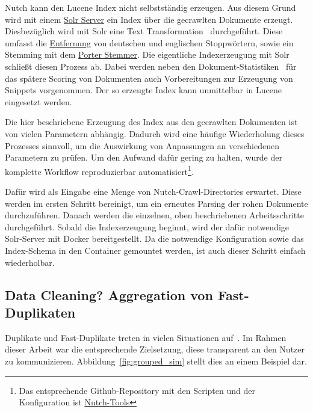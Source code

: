 Nutch kann den Lucene Index nicht selbstständig erzeugen.
Aus diesem Grund wird mit einem \href{http://lucene.apache.org/solr/}{Solr Server} ein Index über die gecrawlten Dokumente erzeugt.
Diesbezüglich wird mit Solr eine Text Transformation~\cite{croft.chap2} durchgeführt.
Diese umfasst die \href{https://github.com/apache/lucene-solr/blob/master/lucene/analysis/common/src/java/org/apache/lucene/analysis/core/StopFilterFactory.java}
{Entfernung} von deutschen und englischen Stoppwörtern, sowie ein Stemming mit dem
\href{https://github.com/apache/lucene-solr/blob/master/lucene/analysis/common/src/java/org/apache/lucene/analysis/en/PorterStemFilterFactory.java}{Porter Stemmer}.
Die eigentliche Indexerzeugung mit Solr schließt diesen Prozess ab.
Dabei werden neben den Dokument-Statistiken~\cite{croft.chap2} für das spätere Scoring von Dokumenten auch Vorbereitungen zur Erzeugung von Snippets vorgenommen.
Der so erzeugte Index kann unmittelbar in Lucene eingesetzt werden.

Die hier beschriebene Erzeugung des Index aus den gecrawlten Dokumenten ist von vielen Parametern abhängig.
Dadurch wird eine häufige Wiederholung dieses Prozesses sinnvoll, um die Auswirkung von Anpassungen an verschiedenen Parametern zu prüfen.
Um den Aufwand dafür gering zu halten, wurde der komplette Workflow reproduzierbar automatisiert\footnote{Das entsprechende Github-Repository mit
den Scripten und der Konfiguration ist \href{https://github.com/mam10eks/nutch_tools/}{Nutch-Tools}}.

Dafür wird als Eingabe eine Menge von Nutch-Crawl-Directories erwartet.
Diese werden im ersten Schritt bereinigt, um ein erneutes Parsing der rohen Dokumente durchzuführen.
Danach werden die einzelnen, oben beschriebenen Arbeitsschritte durchgeführt.
Sobald die Indexerzeugung beginnt, wird der dafür notwendige Solr-Server mit Docker
bereitgestellt. Da die notwendige Konfiguration sowie das Index-Schema in den Container gemountet werden,
ist auch dieser Schritt einfach wiederholbar.

\subsection{Data Cleaning? Aggregation von Fast-Duplikaten}
\label{chap:near_duplicate_detection}

Duplikate und Fast-Duplikate treten in vielen Situationen auf~\cite{croft.chap3}.
Im Rahmen dieser Arbeit war die entsprechende Zielsetzung, diese transparent an den Nutzer zu kommunizieren.
Abbildung~\ref{fig:grouped_sim} stellt dies an einem Beispiel dar.

